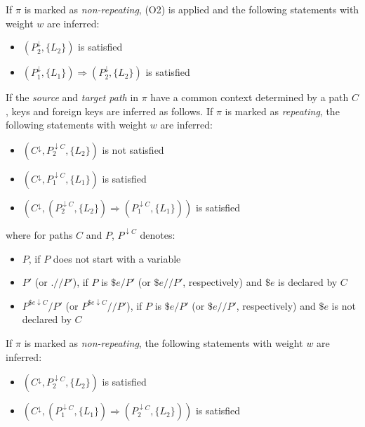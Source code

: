 If $\pi$ is marked as \emph{non-repeating}, (O2) is applied and the following statements with weight $w$ are inferred:
\begin{itemize}
\item $(P_2^{\downarrow}, \{L_2\})$ is satisfied
\item $(P_1^{\downarrow}, \{L_1\}) \Rightarrow (P_2^{\downarrow}, \{L_2\})$ is satisfied
\end{itemize}

If the \emph{source} and \emph{target path} in $\pi$ have a common context determined by a path $C$, keys and foreign keys are inferred as follows. If $\pi$ is marked as \emph{repeating}, the following statements with weight $w$ are inferred:
\begin{itemize}
\item $(C^{\downarrow}, P_2^{\downarrow C}, \{L_2\})$ is not satisfied
\item $(C^{\downarrow}, P_1^{\downarrow C}, \{L_1\})$ is satisfied
\item $(C^{\downarrow}, (P_2^{\downarrow C}, \{L_2\}) \Rightarrow (P_1^{\downarrow C}, \{L_1\}))$ is satisfied
\end{itemize}
where for paths $C$ and $P$, $P^{\downarrow C}$ denotes:
\begin{itemize}
\item $P$, if $P$ does not start with a variable
\item $P'$ (or $.//P'$), if $P$ is $\$e/P'$ (or $\$e//P'$, respectively) and $\$e$ is declared by $C$
\item $P^{\$e\downarrow C}/P'$ (or $P^{\$e\downarrow C}//P'$), if $P$ is $\$e/P'$ (or $\$e//P'$, respectively) and $\$e$ is not declared by $C$
\end{itemize}

If $\pi$ is marked as \emph{non-repeating}, the following statements with weight $w$ are inferred:
\begin{itemize}
\item $(C^{\downarrow}, P_2^{\downarrow C}, \{L_2\})$ is satisfied
\item $(C^{\downarrow}, (P_1^{\downarrow C}, \{L_1\}) \Rightarrow (P_2^{\downarrow C}, \{L_2\}))$ is satisfied
\end{itemize}



